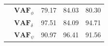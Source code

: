 \begin{table}[]
\begin{tabular}{llcccccc}
                                                   & $\mathbf{VAF}_\phi$                                                & \multicolumn{2}{c}{79.17}                                                                         & \multicolumn{2}{c}{84.03}                                                                         & \multicolumn{2}{c}{80.30}                                                                         \\
                                                   & $\mathbf{VAF}_\delta$                                              & \multicolumn{2}{c}{97.51}                                                                         & \multicolumn{2}{c}{84.09}                                                                         & \multicolumn{2}{c}{94.71}                                                                         \\
                                                   & $\mathbf{VAF}_\psi$                                                & \multicolumn{2}{c}{90.97}                                                                         & \multicolumn{2}{c}{96.41}                                                                         & \multicolumn{2}{c}{91.56}                                                                        
    \end{tabular}
    \end{table}

